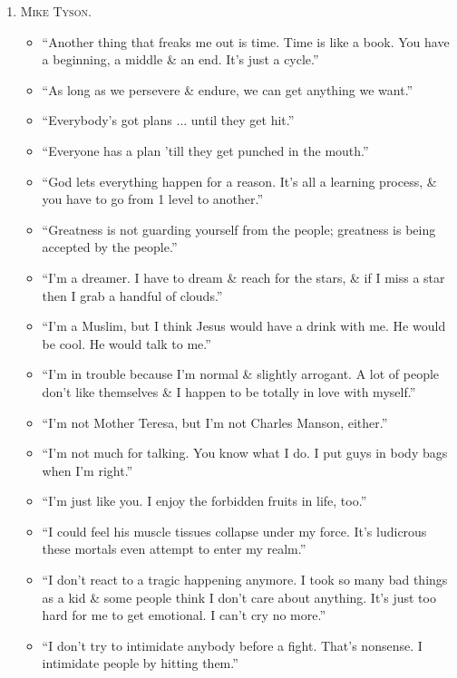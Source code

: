 \documentclass[oneside]{book}
\numberwithin{equation}{section}
\begin{document}
\begin{enumerate}
	\begin{itemize}
		\item ``If God is not in mathematics, then where is He?''\footnote{``Tat Twam Asi'', Isha Upanishad.}
	\end{itemize}
	\item \textsc{Mike Tyson.}
	\begin{itemize}
		\item ``Another thing that freaks me out is time. Time is like a book. You have a beginning, a middle \& an end. It's just a cycle.''
		\item ``As long as we persevere \& endure, we can get anything we want.''
		\item ``Everybody's got plans $\ldots$ until they get hit.''
		\item ``Everyone has a plan 'till they get punched in the mouth.''
		\item ``God lets everything happen for a reason. It's all a learning process, \& you have to go from 1 level to another.''
		\item ``Greatness is not guarding yourself from the people; greatness is being accepted by the people.''
		\item ``I'm a dreamer. I have to dream \& reach for the stars, \& if I miss a star then I grab a handful of clouds.''
		\item ``I'm a Muslim, but I think Jesus would have a drink with me. He would be cool. He would talk to me.''
		\item ``I'm in trouble because I'm normal \& slightly arrogant. A lot of people don't like themselves \& I happen to be totally in love with myself.''
		\item ``I'm not Mother Teresa, but I'm not Charles Manson, either.''
		\item ``I'm not much for talking. You know what I do. I put guys in body bags when I'm right.''
		\item ``I'm just like you. I enjoy the forbidden fruits in life, too.''
		\item ``I could feel his muscle tissues collapse under my force. It's ludicrous these mortals even attempt to enter my realm.''
		\item ``I don't react to a tragic happening anymore. I took so many bad things as a kid \& some people think I don't care about anything. It's just too hard for me to get emotional. I can't cry no more.''
		\item ``I don't try to intimidate anybody before a fight. That's nonsense. I intimidate people by hitting them.''

\end{itemize}
\end{enumerate}
\end{document}
